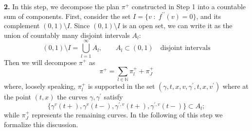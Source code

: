 \documentclass[11pt, twoside, reqno]{amsart}
\theoremstyle{definition}
\theoremstyle{remark}
\numberwithin{equation}{section}
\newcommand{\second}{{\prime \prime}}
\begin{document}
\vspace{0.5cm}
\textbf {2.}
In this step, we decompose the plan $\pi^+$ constructed in Step 1 into  a countable sum of components.  First, consider the set $I =\{v \; : \; f^{\second}(v) =0\}$, and its complement $(0, 1) \setminus I$. Since  $(0, 1) \setminus I$ is an open set, we can write it as the union of countably many disjoint intervals $A_l$:
$$
(0, 1) \setminus I = \bigcup_{l=1}^{\infty} A_l, \qquad A_l \subset (0, 1) \quad \text{disjoint intervals}
$$
Then we will decompose $\pi^+$ as
\begin{equation}
    \pi^+ = \sum_{l \in\mathbb N} \pi^+_l + \pi^+_{J}
\end{equation}
where, loosely speaking, $\pi^+_l$ is supported in the set  $(\gamma,t,x, v,  \gamma^{\prime}, t, x, v^{\prime})$  where at the point $(t, x)$ the curves $\gamma, \gamma^{\prime}$ satisfy 
$$
\{ \gamma^v(t+), \gamma^v(t-), \gamma^{\prime,v}(t+), \gamma^{\prime,v}(t-)\} \subset A_l;
$$
 while $\pi^+_J$ represents the remaining curves. In the following of this step we formalize this discussion.
\end{document}
